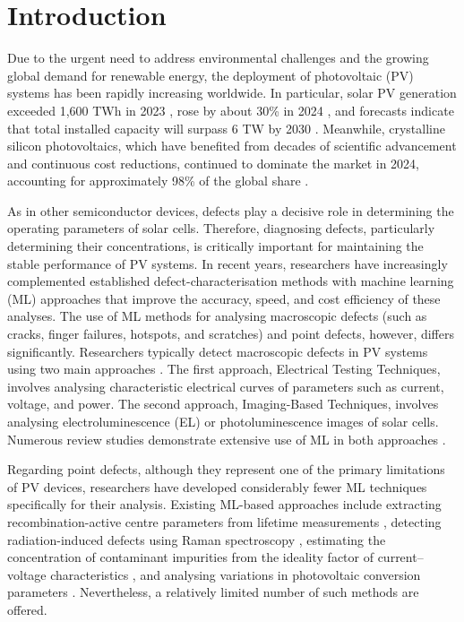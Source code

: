 \documentclass[10pt]{iopart}
\begin{document}
\ioptwocol
%


\section{Introduction}\label{sec:Int}

Due to the urgent need to address environmental challenges and the growing global demand for renewable energy, the deployment of photovoltaic (PV) systems has been rapidly increasing worldwide.
In particular, solar PV generation exceeded 1,600 TWh in 2023 \cite{IEA2024Renewables, OSAMA2025}, rose by about 30\% in 2024 \cite{Prometheus2025}, and forecasts indicate that total installed capacity will surpass 6 TW by 2030 \cite{IEA2024Renewables}.
Meanwhile, crystalline silicon photovoltaics, which have benefited from decades of scientific advancement and continuous cost reductions, continued to dominate the market in 2024, accounting for approximately 98\% of the global share \cite{Fischer2025ITRPV, THOME2025}.

As in other semiconductor devices, defects play a decisive role in determining the operating parameters of solar cells.
Therefore, diagnosing defects, particularly determining their concentrations, is critically important for maintaining the stable performance of PV systems.
In recent years, researchers have increasingly complemented established defect-characterisation methods with machine learning (ML) approaches that improve the accuracy, speed, and cost efficiency of these analyses.
The use of ML methods for analysing macroscopic defects (such as cracks, finger failures, hotspots, and scratches) and point defects, however, differs significantly.
Researchers typically detect macroscopic defects in PV systems using two main approaches \cite{Jia2024, Hijjawi2023}.
The first approach, Electrical Testing Techniques, involves analysing characteristic electrical curves of parameters such as current, voltage, and power.
The second approach, Imaging-Based Techniques, involves analysing electroluminescence (EL) \cite{Liu2024a} or photoluminescence \cite{Doll2021} images of solar cells.
Numerous review studies demonstrate extensive use of ML in both approaches \cite{Datta2023, Jaiswal2023, Buratti2024, MAHDAVIPOUR, Hopwood2020, Li2021, Liu2021}.

Regarding point defects, although they represent one of the primary limitations of PV devices, researchers have developed considerably fewer ML techniques specifically for their analysis.
Existing ML-based approaches include extracting recombination-active centre parameters from lifetime measurements \cite{Wang2024a, Buratti2022, Buratti2020a},
detecting radiation-induced defects using Raman spectroscopy \cite{Park2022, Chia2024},
estimating the concentration of contaminant impurities from the ideality factor of current–voltage characteristics \cite{Olikh2022PPV},
and analysing variations in photovoltaic conversion parameters \cite{Olikh2025SE}.
Nevertheless, a relatively limited number of such methods are offered.
\end{document}
